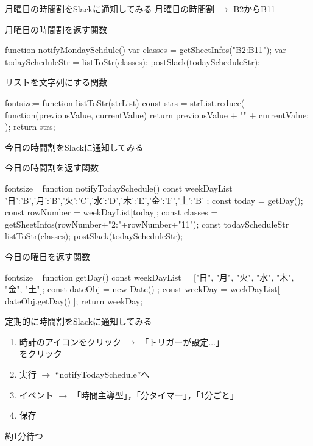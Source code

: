 \documentclass[dvipdfmx,xcolor={svgnames}]{beamer}
\begin{document}
  \begin{frame}[fragile]{月曜日の時間割をSlackに通知してみる}
    月曜日の時間割 $\rightarrow$ B2からB11
    \begin{exampleblock}{月曜日の時間割を返す関数}
      \begin{GAS}
function notifyMondaySchdule(){
  var classes = getSheetInfos("B2:B11");
  var todayScheduleStr = listToStr(classes);
  postSlack(todayScheduleStr);
}
      \end{GAS}
    \end{exampleblock}
    \begin{exampleblock}{リストを文字列にする関数}
      \begin{GAS*}{fontsize=\small}
function listToStr(strList){
  const strs = strList.reduce(
    function(previousValue, currentValue){
    return previousValue + "\n" + currentValue;
  });
  return strs;
}
      \end{GAS*}
    \end{exampleblock}
  \end{frame}
  \begin{frame}[fragile]{今日の時間割をSlackに通知してみる}
    \begin{exampleblock}{今日の時間割を返す関数}
      \begin{GAS*}{fontsize=\scriptsize}
function notifyTodaySchedule(){
  const weekDayList = {
    '日':'B','月':'B','火':'C','水':'D','木':'E','金':'F','土':'B'
  };
  const today = getDay();
  const rowNumber = weekDayList[today];
  const classes = getSheetInfos(rowNumber+"2:"+rowNumber+"11");
  const todayScheduleStr = listToStr(classes);
  postSlack(todayScheduleStr);
}
      \end{GAS*}
    \end{exampleblock}
    \begin{exampleblock}{今日の曜日を返す関数}
      \begin{GAS*}{fontsize=\small}
function getDay(){
  const weekDayList = ["日", "月", "火", "水", "木", "金", "土"];
  const dateObj = new Date() ;
  const weekDay = weekDayList[ dateObj.getDay() ];
  return weekDay;
}
      \end{GAS*}
    \end{exampleblock}
  \end{frame}
  \begin{frame}{定期的に時間割をSlackに通知してみる}
    \begin{enumerate}\setlength{\itemsep}{15pt}
      \item 時計のアイコンをクリック $\rightarrow$ 「トリガーが設定$\ldots$」\\ をクリック
      \item 実行 $\rightarrow$ ``notifyTodaySchedule''へ
      \item イベント $\rightarrow$ 「時間主導型」，「分タイマー」，「1分ごと」
      \item 保存
    \end{enumerate}
    \LARGE 約1分待つ
  \end{frame}
\end{document}

